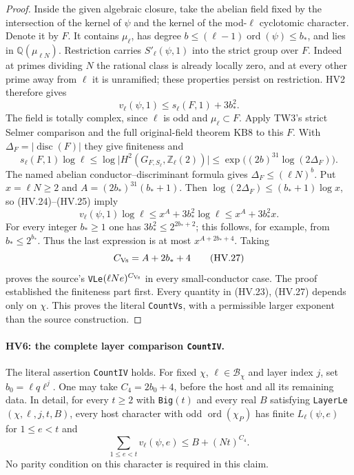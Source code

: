 \begin{proof}
Inside the given algebraic closure, take the abelian field
fixed by the intersection of the kernel of $\psi$ and the
kernel of the mod-$\ell$ cyclotomic character.  Denote it by
$F$.  It contains $\mu_\ell$, has degree
$b\le(\ell-1)\operatorname{ord}(\psi)\le b_*$, and lies
in $\mathbb Q(\mu_{\ell N})$.
Restriction carries $S'_\ell(\psi,1)$ into the strict group
over $F$.  Indeed at primes dividing $N$ the rational class
is already locally zero, and at every other prime away from
$\ell$ it is unramified; these properties persist on restriction.
HV2 therefore gives
\[
                  v_\ell(\psi,1)\le s_\ell(F,1)+3b_*^2.
 \tag{HV.24}
\]
The field is totally complex, since $\ell$ is odd and
$\mu_\ell\subset F$.  Apply TW3's strict Selmer comparison
and the full original-field theorem KB8 to this $F$.
With $\Delta_F=|\operatorname{disc}(F)|$ they give finiteness
and
\[
 s_\ell(F,1)\log\ell
 \le\log\bigl|H^2(G_{F,S_\ell},\mathbb Z_\ell(2))\bigr|
 \le\exp\bigl((2b)^{31}\log(2\Delta_F)\bigr).
 \tag{HV.25}
\]
The named abelian conductor--discriminant formula gives
$\Delta_F\le(\ell N)^b$.  Put $x=\ell N\ge2$ and
$A=(2b_*)^{31}(b_*+1)$.  Then
$\log(2\Delta_F)\le(b_*+1)\log x$, so (HV.24)--(HV.25)
imply
\[
             v_\ell(\psi,1)\log\ell
                    \le x^A+3b_*^2\log\ell
                    \le x^A+3b_*^2x.
 \tag{HV.26}
\]
For every integer $b_*\ge1$ one has
$3b_*^2\le2^{2b_*+2}$; this follows, for example, from
$b_*\le2^{b_*}$.
Thus the last expression is at most $x^{A+2b_*+4}$.
Taking
\[
                     C_{\rm Vs}=A+2b_*+4
 \tag{HV.27}
\]
proves the source's \texttt{VLe}$(\ell Ne)^{C_{\rm Vs}}$
in every small-conductor case.  The proof established the
finiteness part first.  Every quantity in (HV.23), (HV.27)
depends only on $\chi$.  This proves the literal \texttt{CountVs},
with a permissible larger exponent than the source construction.
\end{proof}

\paragraph{HV6: the complete layer comparison \texttt{CountIV}.}
\label{claim:HV6}
The literal assertion \texttt{CountIV} holds.  For fixed
$\chi$, $\ell\in\mathcal B_\chi$ and layer index $j$, set
$b_0=\ell q\ell^j$.  One may take
$C_4=2b_0+4$, before the host and all its remaining data.
In detail, for every $t\ge2$ with \texttt{Big}$(t)$ and every
real $B$ satisfying \texttt{LayerLe}$(\chi,\ell,j,t,B)$,
every host character with odd $\operatorname{ord}(\chi_P)$
has finite $L_\ell(\psi,e)$ for $1\le e<t$ and
\[
          \sum_{1\le e<t}v_\ell(\psi,e)
                                  \le B+(Nt)^{C_4}.
 \tag{HV.28}
\]
No parity condition on this character is required in this claim.

